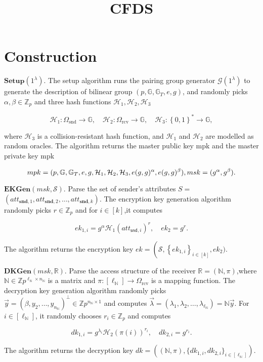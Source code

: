 \documentclass[runningheads]{llncs}
\begin{document}
\title{CFDS}

\section{Construction}
$\mathbf{Setup}(1^\lambda).$ The setup algorithm runs the pairing group generator $\mathcal{G}(1^\lambda)$ to generate the description of bilinear group $(p,\mathbb{G},\mathbb{G}_T,e,g)$, and randomly picks $\alpha,\beta\in\mathbb{Z}_p$ and three hash functions $\mathcal{H}_1,\mathcal{H}_2,\mathcal{H}_3$

$$\mathcal{H}_1:\Omega_{\mathrm{snd}}\to\mathbb{G},\quad\mathcal{H}_2:\Omega_{\mathrm{rcv}}\to\mathbb{G},\quad\mathcal{H}_3:\left\{0,1\right\}^*\to\mathbb{G},$$

where $\mathcal{H}_3$ is a collision-resistant hash function, and $\mathcal{H}_1$ and $\mathcal{H}_2$ are modelled as random oracles. The algorithm returns the master public key mpk and the master private key mpk

$$mpk=(p,\mathbb{G},\mathbb{G}_T,e,g,\mathcal{H}_1,\mathcal{H}_2,\mathcal{H}_3,e(g,g)^\alpha,e(g,g)^\beta),
\\ msk=(g^\alpha,g^\beta).$$

$\mathbf{EKGen}(msk,\mathcal{S}).$ Parse the set of sender's attributes $S=$ $(att_{\mathbf{snd},1},att_{\mathbf{snd},2},\ldots,att_{\mathbf{snd},k}).$ The encryption key generation algorithm randomly picks $r\in\mathbb{Z}_p$ and for $i\in[k]$,it computes

$$ek_{1,i}=g^\alpha\mathcal{H}_1(att_{\mathsf{snd},i})^r,\quad ek_2=g^r.$$

The algorithm returns the encryption key $ek=\left(\mathcal{S},\left\{ek_{1,i}\right\}_{i\in[k]},\right.ek_2).$

$\mathbf{DKGen}(msk,\mathbb{R}).$ Parse the access structure of the receiver $\mathbb{R}=(\mathbb{N},\pi)$,where $\mathbb{N}\in\mathbb{Z}p^{\ell_\mathbb{N}\times n_\mathbb{N}}$ is a matrix and $\pi:[\ell_\mathbb{N}]\to\Omega_\mathrm{rcv}$ is a mapping function. The decryption key generation algorithm randomly picks $\vec{y}=(\beta,y_2,\ldots,y_{n_\mathbb{N}})^\perp\in\mathbb{Z}p^{n_\mathbb{N}\times1}$ and computes $\vec{\lambda}=(\lambda_1,\lambda_2,\ldots,\lambda_{\ell_\mathbb{N}})=\mathbb{N}\vec{y}.$ For $i\in[\ell_\mathbb{N}]$, it randomly chooses ${r_i}\in\mathbb{Z}_p$ and computes

$$dk_{1,i}=g^{\lambda_i}\mathcal{H}_2(\pi(i))^{r_i},\quad dk_{2,i}=g^{r_i}.$$

The algorithm returns the decryption key $dk=((\mathbb{N},\pi),\{ dk_{1, i}, dk_{2, i} \} _{i\in [ \ell _{\mathbb{N} }] }) .$
\end{document}

